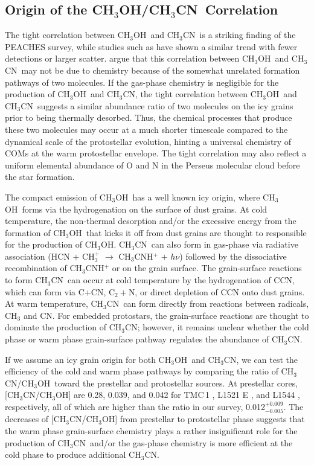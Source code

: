 \documentclass[twocolumn]{aastex62}
\newcommand{\methanol}{\mbox{CH$_{3}$OH}}
\newcommand{\methylcyanide}{\mbox{CH$_{3}$CN}}
\begin{document}
\subsection{Origin of the \methanol/\methylcyanide\ Correlation}
The tight correlation between \methanol\ and \methylcyanide\ is a striking finding of the PEACHES survey, while studies such as \citet{2017ApJ...841..120B,2020AA...635A.198B} have shown a similar trend with fewer detections or larger scatter.  \citet{2020AA...635A.198B} argue that this correlation between \methanol\ and \methylcyanide\ may not be due to chemistry because of the somewhat unrelated formation pathways of two molecules.  If the gas-phase chemistry is negligible for the production of \methanol\ and \methylcyanide, the tight correlation between \methanol\ and \methylcyanide\ suggests a similar abundance ratio of two molecules on the icy grains prior to being thermally desorbed.  Thus, the chemical processes that produce these two molecules may occur at a much shorter timescale compared to the dynamical scale of the protostellar evolution, hinting a universal chemistry of COMs at the warm protostellar envelope.  The tight correlation may also reflect a uniform elemental abundance of O and N in the Perseus molecular cloud before the star formation.

The compact emission of \methanol\ has a well known icy origin, where \methanol\ forms via the hydrogenation on the surface of dust grains.  At cold temperature, the non-thermal desorption and/or the excessive energy from the formation of \methanol\ that kicks it off from dust grains are thought to responsible for the production of \methanol.  \methylcyanide\ can also form in gas-phase via radiative association (HCN $+$ CH$_3^+$ $\rightarrow$ CH$_3$CNH$^+$ $+$ $h\nu$) followed by the dissociative recombination of CH$_3$CNH$^+$ or on the grain surface.  The grain-surface reactions to form \methylcyanide\ can occur at cold temperature by the hydrogenation of CCN, which can form via C$+$CN, C$_2+$N, or direct depletion of CCN onto dust grains.  At warm temperature, \methylcyanide\ can form directly from reactions between radicals, CH$_3$ and CN.  For embedded protostars, the grain-surface reactions are thought to dominate the production of \methylcyanide; however, it remains unclear whether the cold phase or warm phase grain-surface pathway regulates the abundance of \methylcyanide.  

If we assume an icy grain origin for both \methanol\ and \methylcyanide, we can test the efficiency of the cold and warm phase pathways by comparing the ratio of \methylcyanide/\methanol\ toward the prestellar and protostellar sources.  At prestellar cores, [\methylcyanide/\methanol] are 0.28, 0.039, and 0.042 for TMC\,1 \citep{2016ApJS..225...25G}, L1521 E \citep{2019AA...630A.136N}, and L1544 \citep{2019AA...630A.136N}, respectively, all of which are higher than the ratio in our survey, 0.012$^{+0.009}_{-0.005}$.  The decreases of [\methylcyanide/\methanol] from prestellar to protostellar phase suggests that the warm phase grain-surface chemistry plays a rather insignificant role for the production of \methylcyanide\ and/or the gas-phase chemistry is more efficient at the cold phase to produce additional \methylcyanide.
\end{document}
